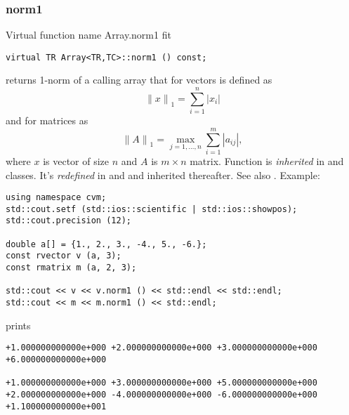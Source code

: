 \subsubsection{norm1}
Virtual function%
\pdfdest name {Array.norm1} fit
\begin{verbatim}
virtual TR Array<TR,TC>::norm1 () const;
\end{verbatim}
returns 1-norm of a calling array that for vectors
is defined as
\begin{equation*}
{\|x\|}_1=\sum_{i=1}^{n} |x_i|
\end{equation*}
and for matrices as
\begin{equation*}
{\|A\|}_{1}=\max_{j=1,\dots,n} \sum_{i=1}^{m} |a_{ij}|,
\end{equation*}
where $x$ is  vector of size $n$ and $A$ is  $m\times n$ matrix.
Function is \emph{inherited} in
 and  classes.
It's \emph{redefined} in
 and 
and inherited thereafter.
See also .
Example:
\begin{Verbatim}
using namespace cvm;
std::cout.setf (std::ios::scientific | std::ios::showpos);
std::cout.precision (12);

double a[] = {1., 2., 3., -4., 5., -6.};
const rvector v (a, 3);
const rmatrix m (a, 2, 3);

std::cout << v << v.norm1 () << std::endl << std::endl;
std::cout << m << m.norm1 () << std::endl;
\end{Verbatim}
prints
\begin{Verbatim}
+1.000000000000e+000 +2.000000000000e+000 +3.000000000000e+000
+6.000000000000e+000

+1.000000000000e+000 +3.000000000000e+000 +5.000000000000e+000
+2.000000000000e+000 -4.000000000000e+000 -6.000000000000e+000
+1.100000000000e+001
\end{Verbatim}
\newpage




